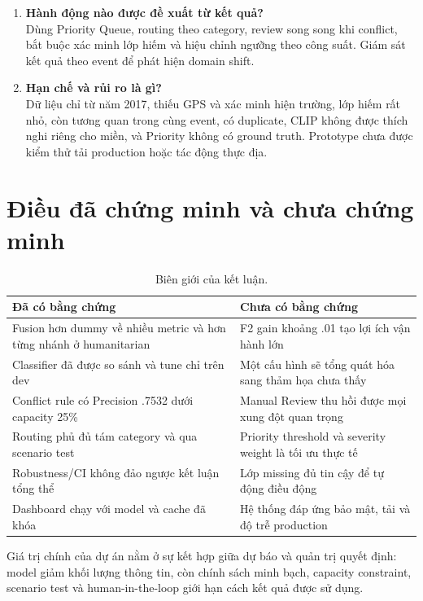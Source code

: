 \begin{enumerate}[leftmargin=*]
  \item \textbf{Hành động nào được đề xuất từ kết quả?}\\
        Dùng Priority Queue, routing theo category, review song song khi
        conflict, bắt buộc xác minh lớp hiếm và hiệu chỉnh ngưỡng theo công suất.
        Giám sát kết quả theo event để phát hiện domain shift.

  \item \textbf{Hạn chế và rủi ro là gì?}\\
        Dữ liệu chỉ từ năm 2017, thiếu GPS và xác minh hiện trường, lớp hiếm rất
        nhỏ, còn tương quan trong cùng event, có duplicate, CLIP không được
        thích nghi riêng cho miền, và Priority không có ground truth. Prototype
        chưa được kiểm thử tải production hoặc tác động thực địa.
\end{enumerate}

\section{Điều đã chứng minh và chưa chứng minh}

\begin{table}[H]\centering\small
\caption{Biên giới của kết luận.}
\begin{tabularx}{\textwidth}{XX}
\toprule
\textbf{Đã có bằng chứng} & \textbf{Chưa có bằng chứng}\\
\midrule
Fusion hơn dummy về nhiều metric và hơn từng nhánh ở humanitarian &
F2 gain khoảng .01 tạo lợi ích vận hành lớn\\
Classifier đã được so sánh và tune chỉ trên dev &
Một cấu hình sẽ tổng quát hóa sang thảm họa chưa thấy\\
Conflict rule có Precision .7532 dưới capacity 25\% &
Manual Review thu hồi được mọi xung đột quan trọng\\
Routing phủ đủ tám category và qua scenario test &
Priority threshold và severity weight là tối ưu thực tế\\
Robustness/CI không đảo ngược kết luận tổng thể &
Lớp missing đủ tin cậy để tự động điều động\\
Dashboard chạy với model và cache đã khóa &
Hệ thống đáp ứng bảo mật, tải và độ trễ production\\
\bottomrule
\end{tabularx}
\end{table}

Giá trị chính của dự án nằm ở sự kết hợp giữa dự báo và quản trị quyết định:
model giảm khối lượng thông tin, còn chính sách minh bạch, capacity constraint,
scenario test và human-in-the-loop giới hạn cách kết quả được sử dụng.
